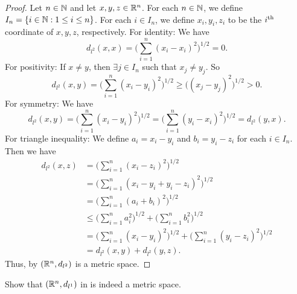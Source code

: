 \begin{proof}
  Let \(n \in \mathbb{N}\) and let \(x, y, z \in \mathbb{R}^n\).
  For each \(n \in \mathbb{N}\), we define \(I_n = \left\lbrace i \in \mathbb{N} : 1 \leq i \leq n\right\rbrace\).
  For each \(i \in I_n\), we define \(x_i, y_i, z_i\) to be the \(i^{\operatorname{th}}\) coordinate of \(x, y, z\), respectively.
  For identity:
  We have
  \[
    d_{l^2}(x, x) = \bigg(\sum_{i = 1}^n (x_i - x_i)^2\bigg)^{1 / 2} = 0.
  \]
  For positivity:
  If \(x \neq y\), then \(\exists j \in I_n\) such that \(x_j \neq y_j\).
  So
  \[
    d_{l^2}(x, y) = \bigg(\sum_{i = 1}^n (x_i - y_i)^2\bigg)^{1 / 2} \geq \big((x_j - y_j)^2\big)^{1 / 2} > 0.
  \]
  For symmetry:
  We have
  \[
    d_{l^2}(x, y) = \bigg(\sum_{i = 1}^n (x_i - y_i)^2\bigg)^{1 / 2} = \bigg(\sum_{i = 1}^n (y_i - x_i)^2\bigg)^{1 / 2} = d_{l^2}(y, x).
  \]
  For triangle inequality:
  We define \(a_i = x_i - y_i\) and \(b_i = y_i - z_i\) for each \(i \in I_n\).
  Then we have
  \begin{align*}
    d_{l^2}(x, z) & = \bigg(\sum_{i = 1}^n (x_i - z_i)^2\bigg)^{1 / 2}                                                    \\
                  & = \bigg(\sum_{i = 1}^n (x_i - y_i + y_i - z_i)^2\bigg)^{1 / 2}                                        \\
                  & = \bigg(\sum_{i = 1}^n (a_i + b_i)^2\bigg)^{1 / 2}                                                    \\
                  & \leq \bigg(\sum_{i = 1}^n a_i^2\bigg)^{1 / 2} + \bigg(\sum_{i = 1}^n b_i^2\bigg)^{1 / 2}              \\
                  & = \bigg(\sum_{i = 1}^n (x_i - y_i)^2\bigg)^{1 / 2} + \bigg(\sum_{i = 1}^n (y_i - z_i)^2\bigg)^{1 / 2} \\
                  & = d_{l^2}(x, y) + d_{l^2}(y, z).
  \end{align*}
  Thus, by  \((\mathbb{R}^n, d_{l^2})\) is a metric space.
\end{proof}

\begin{ex}\label{ii:ex:1.1.7}
  Show that \((\mathbb{R}^n, d_{l^1})\) in  is indeed a metric space.
\end{ex}

